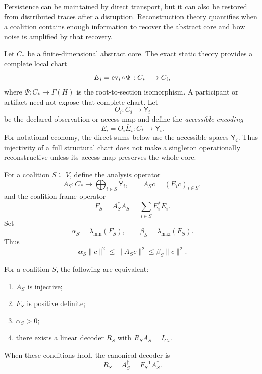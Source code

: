 
Persistence can be maintained by direct transport, but it can also be restored
from distributed traces after a disruption. Reconstruction theory quantifies
when a coalition contains enough information to recover the abstract core and
how noise is amplified by that recovery.


Let \(C_*\) be a finite-dimensional abstract core. The exact static theory
provides a complete local chart
\[
\overline E_i
=
\operatorname{ev}_i\circ\Psi:C_*\longrightarrow C_i,
\]
where \(\Psi:C_*\to\Gamma(H)\) is the root-to-section isomorphism. A participant
or artifact need not expose that complete chart. Let
\[
O_i:C_i\longrightarrow\mathsf Y_i
\]
be the declared observation or access map and define the \emph{accessible
encoding}
\[
\boxed{
E_i=O_i\overline E_i:C_*\longrightarrow\mathsf Y_i.
}
\]
For notational economy, the direct sums below use the accessible spaces
\(\mathsf Y_i\). Thus injectivity of a full structural chart does not make a
singleton operationally reconstructive unless its access map preserves the
whole core.

For a coalition \(S\subseteq V\), define the analysis operator
\[
A_S:C_*\longrightarrow\bigoplus_{i\in S}\mathsf Y_i,
\qquad
A_Sc=(E_ic)_{i\in S},
\]
and the coalition frame operator
\[
\boxed{
F_S=A_S^*A_S=\sum_{i\in S}E_i^*E_i.
}
\]
Set
\[
\alpha_S=\lambda_{\min}(F_S),
\qquad
\beta_S=\lambda_{\max}(F_S).
\]
Thus
\[
\alpha_S\|c\|^2
\leq
\|A_Sc\|^2
\leq
\beta_S\|c\|^2.
\]

\begin{proposition}\label{prop:coalition-frame-criterion}
For a coalition \(S\), the following are equivalent:
\begin{enumerate}
\item \(A_S\) is injective;
\item \(F_S\) is positive definite;
\item \(\alpha_S>0\);
\item there exists a linear decoder \(R_S\) with \(R_SA_S=I_{C_*}\).
\end{enumerate}
When these conditions hold, the canonical decoder is
\[
\boxed{
R_S=A_S^\dagger=F_S^{-1}A_S^*.
}
\]
\end{proposition}

